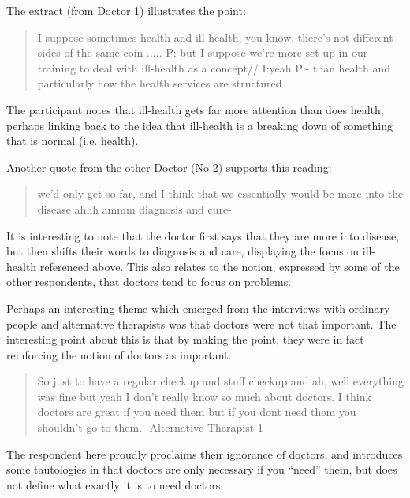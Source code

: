 The extract (from Doctor 1) illustrates the point: 

\begin{quotation}
  I suppose sometimes health and ill health, you know, there's not different sides of the same coin
.....
P: but I suppose we're more set up in our training to deal with ill-health as a concept//
I:yeah
P:- than health and particularly how the health services are structured 

\end{quotation}

The participant notes that ill-health gets far more attention than does health, perhaps linking back to the idea that ill-health is a breaking down of something that is normal (i.e. health). 

Another quote from the other Doctor (No 2) supports this reading:

\begin{quotation}
  we'd only get so far, and I think that we essentially would be more into the disease ahhh ammm diagnosis and cure-

\end{quotation}

It is interesting to note that the doctor first says that they are more into disease, but then shifts their words to diagnosis and care, displaying the focus on ill-health referenced above. This also relates to the notion, expressed by some of the other respondents, that doctors tend to focus on problems. 


Perhaps an interesting theme which emerged from the interviews with ordinary people and alternative therapists was that doctors were not that important. The interesting point about this is that by making the point, they were in fact reinforcing the notion of doctors as important. 

\begin{quotation}
  So just to have a regular checkup and stuff checkup and ah, well everything was fine but yeah I don't really know so much about doctors. I think doctors are great if you need them but if you dont need them you shouldn't go to them.  -Alternative Therapist 1

\end{quotation} 

The respondent here proudly proclaims their ignorance of doctors, and introduces some tautologies in that doctors are only necessary if you ``need'' them, but does not define what exactly it is to need doctors. 

